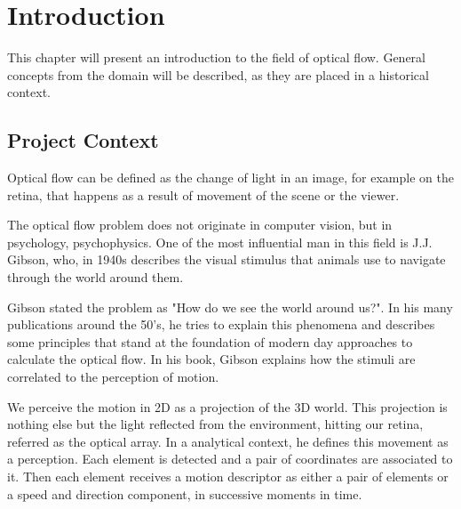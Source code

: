 \documentclass[12pt,a4paper,twoside]{report}
\begin{document}
\thispagestyle{empty}

\newpage




 

\newpage

\tableofcontents
\newpage



\chapter{Introduction}
\pagestyle{headings}

This chapter will present an introduction to the field of optical flow. General concepts from the domain will be described, as they are placed in a historical context.

\section{Project Context}

Optical flow can be defined as the change of light in an image, for example on the retina, that happens as a result of movement of the scene or the viewer.


The optical flow problem does not originate in computer vision, but in psychology, psychophysics. One of the most influential man in this field is J.J. Gibson, who, in 1940s describes the visual stimulus that animals use to navigate through the world around them. 

Gibson stated the problem as "How do we see the world around us?". In his many publications around the 50's, he tries to explain this phenomena and describes some principles that stand at the foundation of modern day approaches to calculate the optical flow. In his book\cite{gibson1950perception}, Gibson explains how the stimuli are correlated to the perception of motion. 

We perceive the motion in 2D as a projection of the 3D world. This projection is nothing else but the light reflected from the environment, hitting our retina, referred as the optical array. In a analytical context, he defines this movement as a perception. Each element is detected and a pair of coordinates are associated to it. Then each element receives a motion descriptor as either a pair of elements or a speed and direction component, in successive moments in time. 
\end{document}
